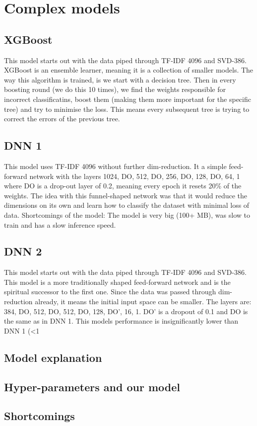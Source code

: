 \section{Complex models}
\subsection{XGBoost}
This model starts out with the data piped through TF-IDF 4096 and SVD-386. XGBoost is an ensemble learner, meaning it is a collection of smaller models. The way this algorithm is trained, is we start with a decision tree. Then in every boosting round (we do this 10 times), we find the weights responsible for incorrect classificatins, boost them (making them more important for the specific tree) and try to minimise the loss. This means every subsequent tree is trying to correct the errors of the previous tree.

\subsection{DNN 1}
This model uses TF-IDF 4096 without further dim-reduction. It a simple feed-forward network with the layers 1024, DO, 512, DO, 256, DO, 128, DO, 64, 1 where DO is a drop-out layer of 0.2, meaning every epoch it resets 20\% of the weights. The idea with this funnel-shaped network was that it would reduce the dimensions on its own and learn how to classify the dataset with minimal loss of data. Shortcomings of the model: The model is very big (100+ MB), was slow to train and has a slow inference speed.

\subsection{DNN 2}
This model starts out with the data piped through TF-IDF 4096 and SVD-386. This model is a more traditionally shaped feed-forward network and is the spiritual successor to the first one. Since the data was passed through dim-reduction already, it means the initial input space can be smaller. The layers are: 384, DO, 512, DO, 512, DO, 128, DO', 16, 1. DO' is a dropout of 0.1 and DO is the same as in DNN 1. This models performance is insignificantly lower than DNN 1 (<1%

\subsection{Model explanation}
\subsection{Hyper-parameters and our model}
\subsection{Shortcomings}
